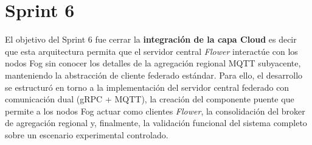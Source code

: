 \documentclass{report}
\begin{document}
\section{Sprint 6}
\label{sect:Sp6}
 El objetivo del Sprint 6 fue cerrar la \textbf{integración de la capa Cloud} es decir que esta arquitectura permita que el servidor central \textit{Flower} interactúe con los nodos Fog sin conocer los detalles de la agregación regional MQTT subyacente, manteniendo la abstracción de cliente federado estándar. Para ello, el desarrollo se estructuró en torno a la implementación del servidor central federado con comunicación dual (gRPC + MQTT), la creación del componente puente que permite a los nodos Fog actuar como clientes \textit{Flower}, la consolidación del broker de agregación regional y, finalmente, la validación funcional del sistema completo sobre un escenario experimental controlado.
\end{document}
